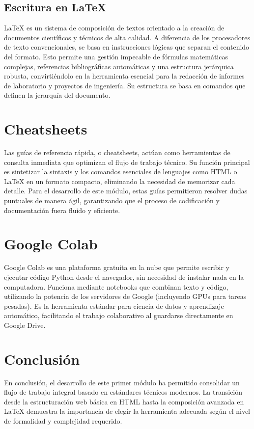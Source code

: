 \documentclass[runningheads]{llncs}
\begin{document}
\subsection{Escritura en LaTeX}

LaTeX es un sistema de composición de textos orientado a la creación de documentos científicos y técnicos de alta calidad. A diferencia de los procesadores de texto convencionales, se basa en instrucciones lógicas que separan el contenido del formato. Esto permite una gestión impecable de fórmulas matemáticas complejas, referencias bibliográficas automáticas y una estructura jerárquica robusta, convirtiéndolo en la herramienta esencial para la redacción de informes de laboratorio y proyectos de ingeniería. Su estructura se basa en comandos que definen la jerarquía del documento.

\section{Cheatsheets}

Las guías de referencia rápida, o cheatsheets, actúan como herramientas de consulta inmediata que optimizan el flujo de trabajo técnico. Su función principal es sintetizar la sintaxis y los comandos esenciales de lenguajes como HTML o LaTeX en un formato compacto, eliminando la necesidad de memorizar cada detalle. Para el desarrollo de este módulo, estas guías permitieron resolver dudas puntuales de manera ágil, garantizando que el proceso de codificación y documentación fuera fluido y eficiente.

\section{Google Colab}

Google Colab es una plataforma gratuita en la nube que permite escribir y ejecutar código Python desde el navegador, sin necesidad de instalar nada en la computadora. Funciona mediante notebooks que combinan texto y código, utilizando la potencia de los servidores de Google (incluyendo GPUs para tareas pesadas). Es la herramienta estándar para ciencia de datos y aprendizaje automático, facilitando el trabajo colaborativo al guardarse directamente en Google Drive.

\section{Conclusión}

En conclusión, el desarrollo de este primer módulo ha permitido consolidar un flujo de trabajo integral basado en estándares técnicos modernos. La transición desde la estructuración web básica en HTML hasta la composición avanzada en LaTeX demuestra la importancia de elegir la herramienta adecuada según el nivel de formalidad y complejidad requerido. 
\end{document}
